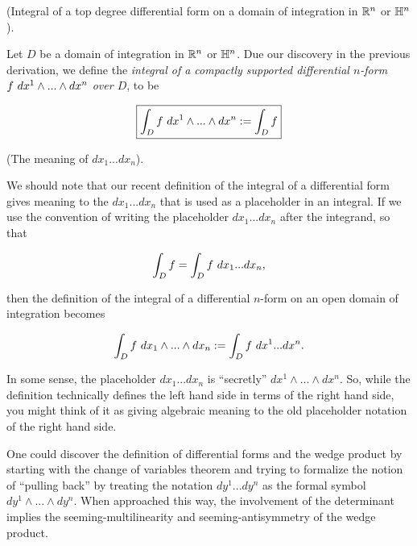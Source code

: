 \begin{defn}
\label{ch::diff_forms::defn::integral_over_domain_of_integration_Rn_Hn}
     (Integral of a top degree differential form on a domain of integration in $\mathbb{R}^n$ or $\mathbb{H}^n$).
    
    Let $D$ be a domain of integration in $\mathbb{R}^n$ or $\mathbb{H}^n$. Due our discovery in the previous derivation, we define the \textit{integral of a compactly supported differential $n$-form $f \text{ } dx^1 \wedge ... \wedge dx^n$ over $D$}, to be
    
    \begin{align*}
        \boxed
        {
            \int_D f \text{ } dx^1 \wedge ... \wedge dx^n := \int_D f
        }
    \end{align*}
\end{defn}

\begin{remark}
    (The meaning of $dx_1 ... dx_n$).
    
    We should note that our recent definition of the integral of a differential form gives meaning to the $dx_1 ... dx_n$ that is used as a placeholder in an integral. If we use the convention of writing the placeholder $dx_1 ... dx_n$ after the integrand, so that
    
    \begin{align*}
        \int_D f = \int_D f \text{ } dx_1 ... dx_n,
    \end{align*}
    
    then the definition of the integral of a differential $n$-form on an open domain of integration becomes
    
    \begin{align*}
        \int_D f \text{ } dx_1 \wedge ... \wedge dx_n := \int_D f \text{ } dx^1 ... dx^n.
    \end{align*}

    In some sense, the placeholder $dx_1 ... dx_n$ is ``secretly'' $dx^1 \wedge ... \wedge dx^n$. So, while the definition technically defines the left hand side in terms of the right hand side, you might think of it as giving algebraic meaning to the old placeholder notation of the right hand side.
\end{remark}

\begin{remark}
    One could discover the definition of differential forms and the wedge product by starting with the change of variables theorem and trying to formalize the notion of ``pulling back'' by treating the notation $dy^1 ... dy^n$ as the formal symbol $dy^1 \wedge ... \wedge dy^n$. When approached this way, the involvement of the determinant implies the seeming-multilinearity and seeming-antisymmetry of the wedge product.
\end{remark}

